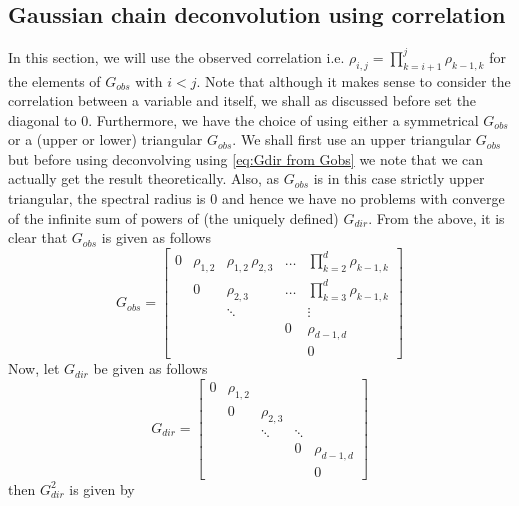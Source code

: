 \documentclass[../Thesis.tex]{subfiles}
\begin{document}
\subsection{Gaussian chain deconvolution using correlation}
In this section, we will use the observed correlation i.e. $\rho_{i,j} = \prod_{k=i+1}^{j} \rho_{k-1,k}$ for the elements of $G_{obs}$ with $i< j$. Note that although it makes sense to consider the correlation between a variable and itself, we shall as discussed before set the diagonal to $0$. Furthermore, we have the choice of using either a symmetrical $G_{obs}$ or a (upper or lower) triangular $G_{obs}$. We shall first use an upper triangular $G_{obs}$ but before using deconvolving using \autoref{eq:Gdir from Gobs} we note that we can actually get the result theoretically. Also, as $G_{obs}$ is in this case strictly upper triangular, the spectral radius is $0$ and hence we have no problems with converge of the infinite sum of powers of (the uniquely defined) $G_{dir}$. From the above, it is clear that $G_{obs}$ is given as follows
\begin{equation}\label{eq:Gaussian chain G_obs trinagular form}
    G_{obs} = \begin{bmatrix}
        0 & \rho_{1,2} & \rho_{1,2}\,\rho_{2,3} & \dots & \prod_{k=2}^{d} \rho_{k-1,k} \\
          & 0          & \rho_{2,3}             & \dots & \prod_{k=3}^{d} \rho_{k-1,k} \\
          &            & \ddots                 &       & \vdots                       \\
          &            &                        & 0     & \rho_{d-1,d}                 \\
          &            &                        &       & 0
    \end{bmatrix}
\end{equation}
Now, let $G_{dir}$ be given as follows
$$G_{dir} = \begin{bmatrix}
        0 & \rho_{1,2} &            &        &              \\
          & 0          & \rho_{2,3} &        &              \\
          &            & \ddots     & \ddots &              \\
          &            &            & 0      & \rho_{d-1,d} \\
          &            &            &        & 0
    \end{bmatrix}$$
then $G_{dir}^2$ is given by
\end{document}
